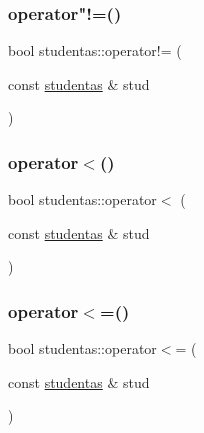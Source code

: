\mbox{\label{classstudentas_a421eb39919e6519907b8886bd6f26a7f}} 
\subsubsection{\texorpdfstring{operator"!=()}{operator!=()}}
{\footnotesize\ttfamily bool studentas\+::operator!= (\begin{DoxyParamCaption}\item[{const \mbox{\hyperlink{classstudentas}{studentas}} \&}]{stud }\end{DoxyParamCaption})}

\mbox{\label{classstudentas_aa8a828dbfbed06fc78e5fa75c839949f}} 
\subsubsection{\texorpdfstring{operator$<$()}{operator<()}}
{\footnotesize\ttfamily bool studentas\+::operator$<$ (\begin{DoxyParamCaption}\item[{const \mbox{\hyperlink{classstudentas}{studentas}} \&}]{stud }\end{DoxyParamCaption})}

\mbox{\label{classstudentas_aa63f3fbfc3c16bf9e243bee4d4ec804a}} 
\subsubsection{\texorpdfstring{operator$<$=()}{operator<=()}}
{\footnotesize\ttfamily bool studentas\+::operator$<$= (\begin{DoxyParamCaption}\item[{const \mbox{\hyperlink{classstudentas}{studentas}} \&}]{stud }\end{DoxyParamCaption})}

\mbox{\label{classstudentas_ab34876d457c27eafac70ee5a416595cf}} 
